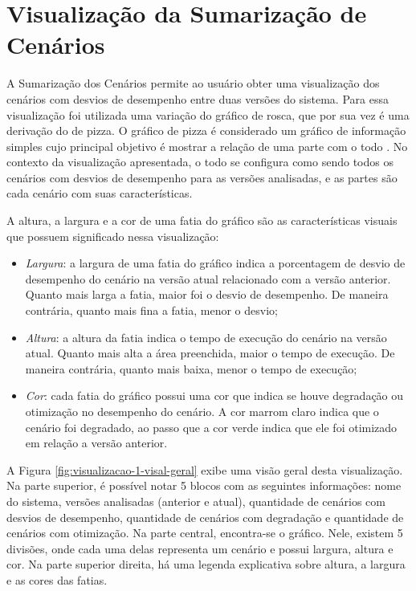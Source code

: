 \section{Visualização da Sumarização de Cenários} \label{sec:visualizacao1}

A Sumarização dos Cenários permite ao usuário obter uma visualização dos cenários com desvios de desempenho entre duas versões do sistema. Para essa visualização foi utilizada uma variação do gráfico de rosca, que por sua vez é uma derivação do de pizza. O gráfico de pizza é considerado um gráfico de informação simples cujo principal objetivo é mostrar a relação de uma parte com o todo \cite{Spence2005}. No contexto da visualização apresentada, o todo se configura como sendo todos os cenários com desvios de desempenho para as versões analisadas, e as partes são cada cenário com suas características.

A altura, a largura e a cor de uma fatia do gráfico são as características visuais que possuem significado nessa visualização:

\begin{itemize}
   \item \textit{Largura}: a largura de uma fatia do gráfico indica a porcentagem de desvio de desempenho do cenário na versão atual relacionado com a versão anterior. Quanto mais larga a fatia, maior foi o desvio de desempenho. De maneira contrária, quanto mais fina a fatia, menor o desvio;
   \item \textit{Altura}: a altura da fatia indica o tempo de execução do cenário na versão atual. Quanto mais alta a área preenchida, maior o tempo de execução. De maneira contrária, quanto mais baixa, menor o tempo de execução;
   \item \textit{Cor}: cada fatia do gráfico possui uma cor que indica se houve degradação ou otimização no desempenho do cenário. A cor marrom claro indica que o cenário foi degradado, ao passo que a cor verde indica que ele foi otimizado em relação a versão anterior.
\end{itemize}

A Figura \ref{fig:visualizacao-1-visal-geral} exibe uma visão geral desta visualização. Na parte superior, é possível notar 5 blocos com as seguintes informações: nome do sistema, versões analisadas (anterior e atual), quantidade de cenários com desvios de desempenho, quantidade de cenários com degradação e quantidade de cenários com otimização. Na parte central, encontra-se o gráfico. Nele, existem 5 divisões, onde cada uma delas representa um cenário e possui largura, altura e cor. Na parte superior direita, há uma legenda explicativa sobre altura, a largura e as cores das fatias.


